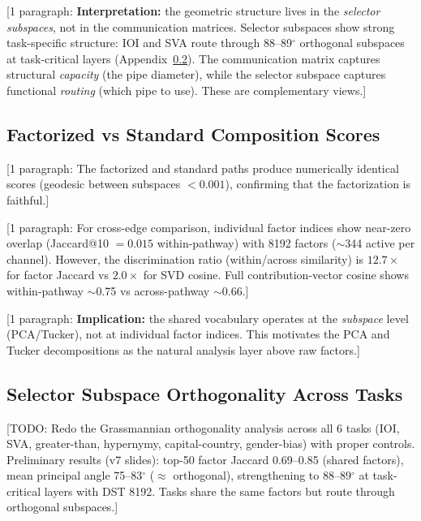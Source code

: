 \documentclass[11pt]{article}
\begin{document}
[1 paragraph: \textbf{Interpretation:} the geometric structure
lives in the \emph{selector subspaces}, not in the communication
matrices. Selector subspaces show strong task-specific structure:
IOI and SVA route through 88--89$^\circ$ orthogonal subspaces at
task-critical layers (Appendix~\ref{app:selector_orthogonality}).
The communication matrix captures structural \emph{capacity} (the
pipe diameter), while the selector subspace captures functional
\emph{routing} (which pipe to use). These are complementary views.]

\subsection{Factorized vs Standard Composition Scores}
\label{app:fac_vs_std_cs}


[1 paragraph: The factorized and standard paths produce numerically
identical scores (geodesic between subspaces $< 0.001$), confirming
that the factorization is faithful.]

[1 paragraph: For cross-edge comparison, individual factor indices
show near-zero overlap (Jaccard@10 $= 0.015$ within-pathway) with
8192 factors ($\sim$344 active per channel). However, the
discrimination ratio (within/across similarity) is $12.7\times$
for factor Jaccard vs $2.0\times$ for SVD cosine. Full
contribution-vector cosine shows within-pathway $\sim$0.75 vs
across-pathway $\sim$0.66.]

[1 paragraph: \textbf{Implication:} the shared vocabulary
operates at the \emph{subspace} level (PCA/Tucker), not
at individual factor indices. This motivates the PCA and Tucker
decompositions as the natural analysis layer above raw factors.]

\subsection{Selector Subspace Orthogonality Across Tasks}
\label{app:selector_orthogonality}


[TODO: Redo the Grassmannian orthogonality analysis across all 6
tasks (IOI, SVA, greater-than, hypernymy, capital-country,
gender-bias) with proper controls. Preliminary results (v7 slides):
top-50 factor Jaccard 0.69--0.85 (shared factors), mean principal
angle 75--83$^\circ$ ($\approx$ orthogonal), strengthening to
88--89$^\circ$ at task-critical layers with DST 8192. Tasks share
the same factors but route through orthogonal subspaces.]
\end{document}

